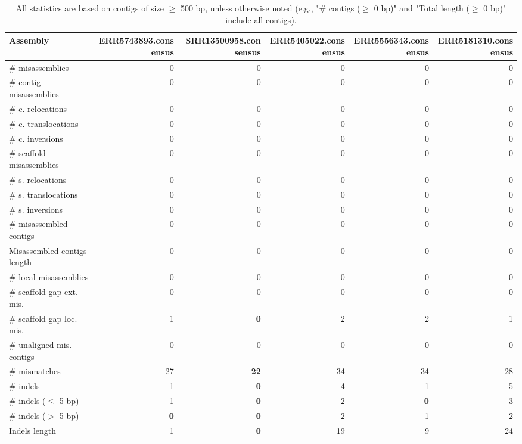 \documentclass[12pt,a4paper]{article}
\begin{document}
\begin{table}[ht]
\begin{center}
\caption{All statistics are based on contigs of size $\geq$ 500 bp, unless otherwise noted (e.g., "\# contigs ($\geq$ 0 bp)" and "Total length ($\geq$ 0 bp)" include all contigs).}
\begin{tabular}{|l*{5}{|r}|}
\hline
Assembly & ERR5743893.consensus & SRR13500958.consensus & ERR5405022.consensus & ERR5556343.consensus & ERR5181310.consensus \\ \hline
\# misassemblies & 0 & 0 & 0 & 0 & 0 \\ \hline
\hspace{2mm}\# contig misassemblies & 0 & 0 & 0 & 0 & 0 \\ \hline
\hspace{5mm}\# c. relocations & 0 & 0 & 0 & 0 & 0 \\ \hline
\hspace{5mm}\# c. translocations & 0 & 0 & 0 & 0 & 0 \\ \hline
\hspace{5mm}\# c. inversions & 0 & 0 & 0 & 0 & 0 \\ \hline
\hspace{2mm}\# scaffold misassemblies & 0 & 0 & 0 & 0 & 0 \\ \hline
\hspace{5mm}\# s. relocations & 0 & 0 & 0 & 0 & 0 \\ \hline
\hspace{5mm}\# s. translocations & 0 & 0 & 0 & 0 & 0 \\ \hline
\hspace{5mm}\# s. inversions & 0 & 0 & 0 & 0 & 0 \\ \hline
\# misassembled contigs & 0 & 0 & 0 & 0 & 0 \\ \hline
Misassembled contigs length & 0 & 0 & 0 & 0 & 0 \\ \hline
\# local misassemblies & 0 & 0 & 0 & 0 & 0 \\ \hline
\# scaffold gap ext. mis. & 0 & 0 & 0 & 0 & 0 \\ \hline
\# scaffold gap loc. mis. & 1 & {\bf 0} & 2 & 2 & 1 \\ \hline
\# unaligned mis. contigs & 0 & 0 & 0 & 0 & 0 \\ \hline
\# mismatches & 27 & {\bf 22} & 34 & 34 & 28 \\ \hline
\# indels & 1 & {\bf 0} & 4 & 1 & 5 \\ \hline
\hspace{5mm}\# indels ($\leq$ 5 bp) & 1 & {\bf 0} & 2 & {\bf 0} & 3 \\ \hline
\hspace{5mm}\# indels ($>$ 5 bp) & {\bf 0} & {\bf 0} & 2 & 1 & 2 \\ \hline
Indels length & 1 & {\bf 0} & 19 & 9 & 24 \\ \hline
\end{tabular}
\end{center}
\end{table}
\end{document}
